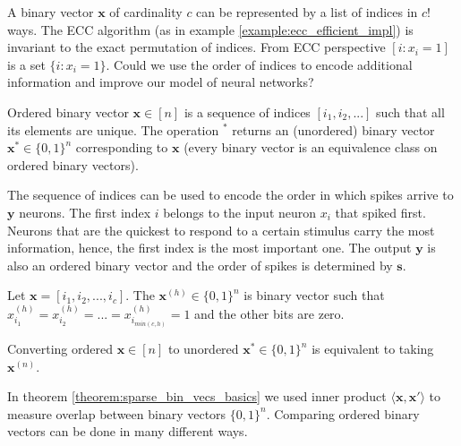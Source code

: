 \documentclass[oneside,english,logo]{amuthesis}
\begin{document}
A binary vector $\boldsymbol{x}$ of cardinality $c$ can be represented by a list of indices in $c!$ ways.
The ECC algorithm (as in example \ref{example:ecc_efficient_impl}) is invariant to the exact permutation of indices.
From ECC perspective $[i : x_i=1]$ is a set $\{i : x_i=1\}$. Could we use the order of indices to encode additional information and improve our model of neural networks?


\begin{definition}
Ordered binary vector $\boldsymbol{x}\in [n]$ is a sequence of indices $[i_1,i_2,...]$ such that all its elements are unique. The operation ${}^*$ returns an (unordered) binary vector $\boldsymbol{x}^* \in \{0,1\}^n$ corresponding to $\boldsymbol{x}$ (every binary vector is an equivalence class on ordered binary vectors).
\end{definition}

The sequence of indices can be used to encode the order in which spikes arrive to $\boldsymbol{y}$ neurons. The first index $i$ belongs to the input neuron $x_i$ that spiked first. Neurons that are the quickest to respond to a certain stimulus  carry the most information, hence, the first index is the most important one. The output $\boldsymbol{y}$ is also an ordered binary vector and the order of spikes is determined by $\boldsymbol{s}$.
\begin{definition}
Let $\boldsymbol{x}=[i_1,i_2,...,i_c]$.
The $\boldsymbol{x}^{(h)}\in \{0,1\}^n$ is binary vector such that $x^{(h)}_{i_1}=x^{(h)}_{i_2}=...=x^{(h)}_{i_{min(c,h)}}=1$ and the other bits are zero.
\end{definition}
\begin{lemma}
Converting ordered $\boldsymbol{x}\in [n]$ to unordered $\boldsymbol{x}^*\in\{0,1\}^n$ is equivalent to taking $\boldsymbol{x}^{(n)}$.
\end{lemma}

In theorem \ref{theorem:sparse_bin_vecs_basics} we used inner product $\langle \boldsymbol{x},\boldsymbol{x}' \rangle$ to measure overlap between binary vectors $\{0,1\}^n$. Comparing ordered binary vectors can be done in many different ways. 
\end{document}
